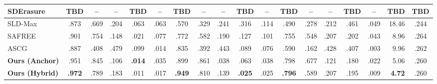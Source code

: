 \begin{table}[!t]
{\begin{tabular}{lcccccccccccccccrc}
    \color{gray} SDErasure
    & \color{gray}TBD & \color{gray}-- & \color{gray}-- & \color{gray}TBD & \color{gray}--
    & \color{gray}TBD & \color{gray}-- & \color{gray}-- & \color{gray}TBD & \color{gray}--
    & \color{gray}TBD & \color{gray}-- & \color{gray}-- & \color{gray}TBD & \color{gray}--
    & \color{gray}TBD & \color{gray}TBD \\

    \midrule

    SLD-Max
    & .873 & \color{gray}.669 & \color{gray}.204 & .063 & .063
    & .570 & \color{gray}.329 & \color{gray}.241 & .316 & .114
    & .490 & \color{gray}.278 & \color{gray}.212 & .461 & .049
    & 18.46 & .244 \\

    SAFREE
    & .901 & \color{gray}.754 & \color{gray}.148 & .021 & .077
    & .772 & \color{gray}.582 & \color{gray}.190 & .127 & .101
    & .755 & \color{gray}.548 & \color{gray}.207 & .202 & .043
    & 8.96 & .264 \\

    ASCG
    & .887 & \color{gray}.408 & \color{gray}.479 & .099 & .014
    & .835 & \color{gray}.392 & \color{gray}.443 & .089 & .076
    & .590 & \color{gray}.162 & \color{gray}.428 & .407 & .003
    & 9.96 & .262 \\

    \midrule

    \rowcolor{blue!8} \textbf{Ours (Anchor)}
    & .951 & \color{gray}.845 & \color{gray}.106 & \textbf{.014} & .035
    & .899 & \color{gray}.861 & \color{gray}.038 & .063 & .038
    & .798 & \color{gray}.677 & \color{gray}.121 & .180 & .022
    & 5.06 & .260 \\

    \rowcolor{blue!8} \textbf{Ours (Hybrid)}
    & \textbf{.972} & \color{gray}.789 & \color{gray}.183 & .011 & .017
    & \textbf{.949} & \color{gray}.810 & \color{gray}.139 & \textbf{.025} & .025
    & \textbf{.796} & \color{gray}.589 & \color{gray}.207 & .195 & .009
    & \textbf{4.72} & .260 \\

    \bottomrule
    \end{tabular}}
\end{table}
